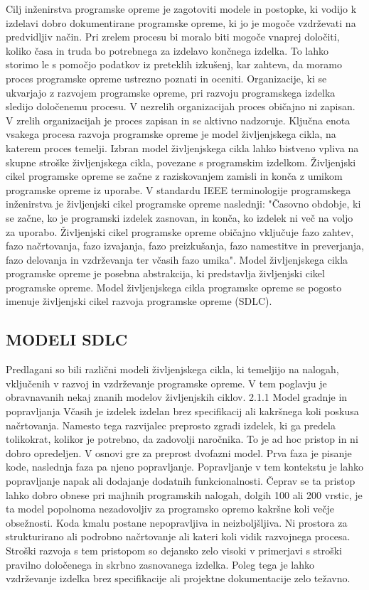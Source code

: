 \documentclass[a4paper,12pt,openright]{book}
\begin{document}
Cilj inženirstva programske opreme je zagotoviti modele in postopke, ki vodijo k izdelavi dobro dokumentirane programske opreme, ki jo je mogoče vzdrževati na predvidljiv način. Pri zrelem procesu bi moralo biti mogoče vnaprej določiti, koliko časa in truda bo potrebnega za izdelavo končnega izdelka. To lahko storimo le s pomočjo podatkov iz preteklih izkušenj, kar zahteva, da moramo proces programske opreme ustrezno poznati in oceniti.
Organizacije, ki se ukvarjajo z razvojem programske opreme, pri razvoju programskega izdelka sledijo določenemu procesu. V nezrelih organizacijah proces običajno ni zapisan. V zrelih organizacijah je proces zapisan in se aktivno nadzoruje. Ključna enota vsakega procesa razvoja programske opreme je model življenjskega cikla, na katerem proces temelji. Izbran model življenjskega cikla lahko bistveno vpliva na skupne stroške življenjskega cikla, povezane s programskim izdelkom. Življenjski cikel programske opreme se začne z raziskovanjem zamisli in konča z umikom programske opreme iz uporabe.
V standardu IEEE terminologije programskega inženirstva je življenjski cikel programske opreme naslednji:
"Časovno obdobje, ki se začne, ko je programski izdelek zasnovan, in konča, ko izdelek ni več na voljo za uporabo. Življenjski cikel programske opreme običajno vključuje fazo zahtev, fazo načrtovanja, fazo izvajanja, fazo preizkušanja, fazo namestitve in preverjanja, fazo delovanja in vzdrževanja ter včasih fazo umika".
Model življenjskega cikla programske opreme je posebna abstrakcija, ki predstavlja življenjski cikel programske opreme. Model življenjskega cikla programske opreme se pogosto imenuje življenjski cikel razvoja programske opreme (SDLC).
\subsection{MODELI SDLC}

Predlagani so bili različni modeli življenjskega cikla, ki temeljijo na nalogah, vključenih v razvoj in vzdrževanje programske opreme. V tem poglavju je obravnavanih nekaj znanih modelov življenjskih ciklov.
2.1.1 Model gradnje in popravljanja
Včasih je izdelek izdelan brez specifikacij ali kakršnega koli poskusa načrtovanja. Namesto tega razvijalec preprosto zgradi izdelek, ki ga predela tolikokrat, kolikor je potrebno, da zadovolji naročnika.
To je ad hoc pristop in ni dobro opredeljen. V osnovi gre za preprost dvofazni model. Prva faza je pisanje kode, naslednja faza pa njeno popravljanje. Popravljanje v tem kontekstu je lahko popravljanje napak ali dodajanje dodatnih funkcionalnosti.
Čeprav se ta pristop lahko dobro obnese pri majhnih programskih nalogah, dolgih 100 ali 200 vrstic, je ta model popolnoma nezadovoljiv za programsko opremo kakršne koli večje obsežnosti. Koda kmalu postane nepopravljiva in neizboljšljiva. Ni prostora za strukturirano ali podrobno načrtovanje ali kateri koli vidik razvojnega procesa. Stroški razvoja s tem pristopom so dejansko zelo visoki v primerjavi s stroški pravilno določenega in skrbno zasnovanega izdelka. Poleg tega je lahko vzdrževanje izdelka brez specifikacije ali projektne dokumentacije zelo težavno.
\end{document}
